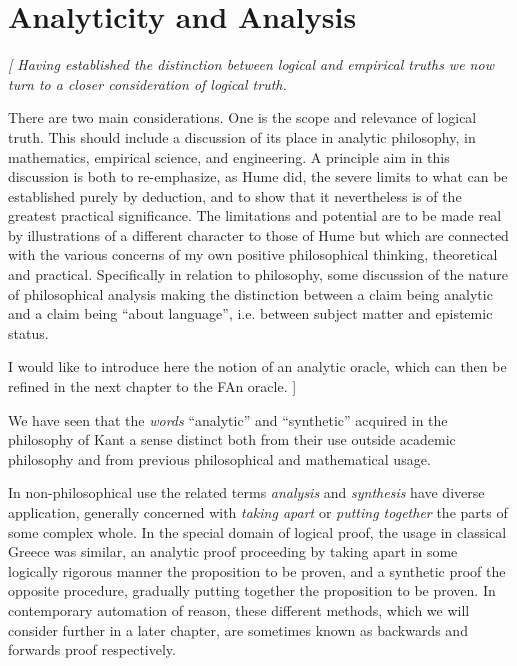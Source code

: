 
\chapter{Analyticity and Analysis}\label{AnalyticityAnalysis}

{\it[
Having established the distinction between logical and empirical
truths we now turn to a closer consideration of logical truth. 

There are two main considerations.
One is the scope and relevance of logical truth.
This should include a discussion of its place in analytic philosophy,
in mathematics, empirical science, and engineering. 
A principle aim in this discussion is both to re-emphasize, as Hume
did, the severe limits to what can be established purely by deduction,
and to show that it nevertheless is of the greatest practical
significance. 
The limitations and potential are to be made real by illustrations of
a different character to those of Hume but which are connected with
the various concerns of my own positive philosophical thinking,
theoretical and practical. 
Specifically in relation to philosophy, some discussion of the nature
of philosophical analysis making the distinction between a claim being
analytic and a claim being ``about language'', i.e. between subject
matter and epistemic status. 

I would like to introduce here the notion of an analytic oracle, which
can then be refined in the next chapter to the FAn oracle.
]}%


We have seen that the \emph{words} ``analytic'' and
``synthetic'' acquired in the philosophy of Kant a
sense distinct both from their use outside academic philosophy and
from previous philosophical and mathematical usage. 

In non-philosophical use the related terms
\emph{analysis} and \emph{synthesis}
have diverse application, generally concerned with \emph{taking apart}
or \emph{putting together} the parts of some complex whole. 
In the special domain of logical proof, the usage in classical Greece
was similar, an analytic proof proceeding by taking apart in some
logically rigorous manner the proposition to be proven, and a
synthetic proof the opposite procedure, gradually putting together the
proposition to be proven. 
In contemporary automation of reason, these different methods, which
we will consider further in a later chapter, are sometimes known as
backwards and forwards proof respectively. 

